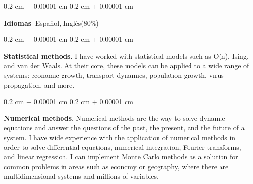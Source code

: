 \documentclass[10pt, letterpaper]{article}
\newenvironment{onecolentry}{
    \begin{adjustwidth}{
        0.2 cm + 0.00001 cm
    }{
        0.2 cm + 0.00001 cm
    }
}{
    \end{adjustwidth}
} %
\begin{document}
        \begin{onecolentry}
            \textbf{Idiomas}: Español, Inglés(80\%)
        \end{onecolentry}




        \vspace{0.2 cm}
        
        \begin{onecolentry}
            \textbf{Statistical methods}. I have worked with statistical models such as O(n), Ising, and van der Waals. At their core, these models can be applied to a wide range of systems: economic growth, transport dynamics, population growth, virus propagation, and more.


        \end{onecolentry}

        \vspace{0.2 cm}

        \begin{onecolentry}
            \textbf{Numerical methods}. Numerical methods are the way to solve dynamic equations and answer the questions of the past, the present, and the future of a system. I have wide experience with the application of numerical methods in order to solve differential equations, numerical integration, Fourier transforms, and linear regression. I can implement Monte Carlo methods as a solution for common problems in areas such as economy or geography, where there are multidimensional systems and millions of variables.
        \end{onecolentry}
        \vspace{0.2 cm}
\end{document}
